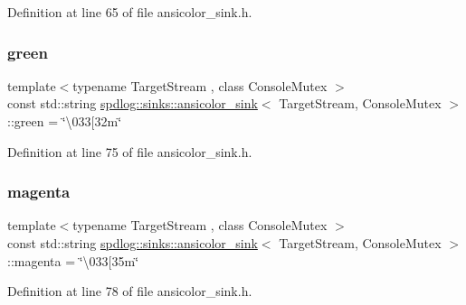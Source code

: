 Definition at line 65 of file ansicolor\+\_\+sink.\+h.

\mbox{\label{classspdlog_1_1sinks_1_1ansicolor__sink_ab762e65612c98bbc6b264fb4b042fc9c}} 
\subsubsection{\texorpdfstring{green}{green}}
{\footnotesize\ttfamily template$<$typename Target\+Stream , class Console\+Mutex $>$ \\
const std\+::string \hyperlink{classspdlog_1_1sinks_1_1ansicolor__sink}{spdlog\+::sinks\+::ansicolor\+\_\+sink}$<$ Target\+Stream, Console\+Mutex $>$\+::green = \char`\"{}\textbackslash{}033\mbox{[}32m\char`\"{}}



Definition at line 75 of file ansicolor\+\_\+sink.\+h.

\mbox{\label{classspdlog_1_1sinks_1_1ansicolor__sink_a9a665375cbfd2c7ab4a07004df386fce}} 
\subsubsection{\texorpdfstring{magenta}{magenta}}
{\footnotesize\ttfamily template$<$typename Target\+Stream , class Console\+Mutex $>$ \\
const std\+::string \hyperlink{classspdlog_1_1sinks_1_1ansicolor__sink}{spdlog\+::sinks\+::ansicolor\+\_\+sink}$<$ Target\+Stream, Console\+Mutex $>$\+::magenta = \char`\"{}\textbackslash{}033\mbox{[}35m\char`\"{}}



Definition at line 78 of file ansicolor\+\_\+sink.\+h.

\mbox{\label{classspdlog_1_1sinks_1_1ansicolor__sink_ac887dfeac8f16dbd96128398333786f5}} 
